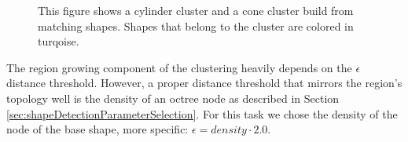 \begin{figure}
\centering
{}
	\caption{This figure shows a cylinder cluster and a cone cluster build from matching shapes. Shapes that belong to the cluster are colored in turqoise.}
	\label{fig:regionGrowingConeCylinder}
\end{figure}

The region growing component of the clustering heavily depends on the $\epsilon$ distance threshold. However, a proper distance threshold that mirrors the region's topology well is the density of an octree node as described in Section \ref{sec:shapeDetectionParameterSelection}. For this task we chose the density of the node of the base shape, more specific: $\epsilon = density \cdot 2.0$.